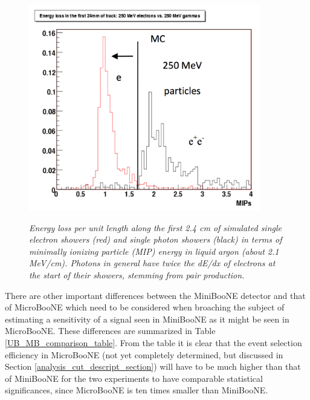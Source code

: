 \begin{figure}[ht!]
\centering
	\includegraphics[width=0.9\textwidth]{Figures/UB_TDR_egamma_dedx.png} \\
\caption{\textit{Energy loss per unit length along the first 2.4 cm of simulated single electron showers (red) and single photon showers (black) in terms of minimally ionizing particle (MIP) energy in liquid argon (about 2.1 MeV/cm). Photons in general have twice the dE/dx of electrons at the start of their showers, stemming from pair production.}}\label{UB_TDR_egammadedx_fig}
\end{figure}

There are other important differences between the MiniBooNE detector and that of MicroBooNE which need to be considered when broaching the subject of estimating a sensitivity of a signal seen in MiniBooNE as it might be seen in MicroBooNE. These differences are summarized in Table \ref{UB_MB_comparison_table}. From the table it is clear that the event selection efficiency in MicroBooNE (not yet completely determined, but discussed in Section \ref{analysis_cut_descript_section}) will have to be much higher than that of MiniBooNE for the two experiments to have comparable statistical significances, since MicroBooNE is ten times smaller than MiniBooNE. 

